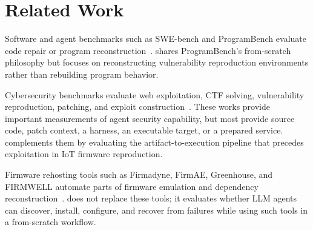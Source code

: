 \section{Related Work}
Software and agent benchmarks such as SWE-bench and ProgramBench evaluate code repair or program reconstruction~\cite{swebench,programbench}. \sys{} shares ProgramBench's from-scratch philosophy but focuses on reconstructing vulnerability reproduction environments rather than rebuilding program behavior.

Cybersecurity benchmarks evaluate web exploitation, CTF solving, vulnerability reproduction, patching, and exploit construction~\cite{cybergym,cvebench,secbench,bountybench,exploitgym,exploitbench,krepro}. These works provide important measurements of agent security capability, but most provide source code, patch context, a harness, an executable target, or a prepared service. \sys{} complements them by evaluating the artifact-to-execution pipeline that precedes exploitation in IoT firmware reproduction.

Firmware rehosting tools such as Firmadyne, FirmAE, Greenhouse, and FIRMWELL automate parts of firmware emulation and dependency reconstruction~\cite{firmadyne,firmae,greenhouse,firmwell}. \sys{} does not replace these tools; it evaluates whether LLM agents can discover, install, configure, and recover from failures while using such tools in a from-scratch workflow.
